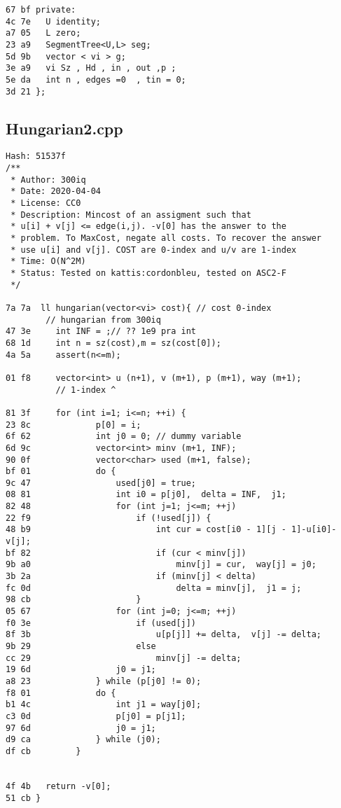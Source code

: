 \documentclass[11pt, a4paper, twoside]{article}
\begin{document}
\begin{lstlisting}
67 bf private:
4c 7e 	U identity;
a7 05 	L zero;
23 a9 	SegmentTree<U,L> seg;
5d 9b 	vector < vi > g; 
3e a9 	vi Sz , Hd , in , out ,p ; 
5e da 	int n , edges =0  , tin = 0;
3d 21 };	
\end{lstlisting}

\subsection{Hungarian2.cpp}
\begin{lstlisting}
Hash: 51537f
/**
 * Author: 300iq
 * Date: 2020-04-04
 * License: CC0
 * Description: Mincost of an assigment such that
 * u[i] + v[j] <= edge(i,j). -v[0] has the answer to the
 * problem. To MaxCost, negate all costs. To recover the answer
 * use u[i] and v[j]. COST are 0-index and u/v are 1-index 
 * Time: O(N^2M)
 * Status: Tested on kattis:cordonbleu, tested on ASC2-F
 */
 
7a 7a  ll hungarian(vector<vi> cost){ // cost 0-index
        // hungarian from 300iq
47 3e     int INF = ;// ?? 1e9 pra int 
68 1d     int n = sz(cost),m = sz(cost[0]);
4a 5a     assert(n<=m);
      
01 f8     vector<int> u (n+1), v (m+1), p (m+1), way (m+1);
          // 1-index ^
         
81 3f     for (int i=1; i<=n; ++i) {
23 8c             p[0] = i;
6f 62             int j0 = 0; // dummy variable
6d 9c             vector<int> minv (m+1, INF);
90 0f             vector<char> used (m+1, false);
bf 01             do {
9c 47                 used[j0] = true;
08 81                 int i0 = p[j0],  delta = INF,  j1;
82 48                 for (int j=1; j<=m; ++j)
22 f9                     if (!used[j]) {
48 b9                         int cur = cost[i0 - 1][j - 1]-u[i0]-v[j];
bf 82                         if (cur < minv[j])
9b a0                             minv[j] = cur,  way[j] = j0;
3b 2a                         if (minv[j] < delta)
fc 0d                             delta = minv[j],  j1 = j;
98 cb                     }
05 67                 for (int j=0; j<=m; ++j)
f0 3e                     if (used[j])
8f 3b                         u[p[j]] += delta,  v[j] -= delta;
9b 29                     else
cc 29                         minv[j] -= delta;
19 6d                 j0 = j1;
a8 23             } while (p[j0] != 0);
f8 01             do {
b1 4c                 int j1 = way[j0];
c3 0d                 p[j0] = p[j1];
97 6d                 j0 = j1;
d9 ca             } while (j0);
df cb         }
          
      
4f 4b   return -v[0];
51 cb }
\end{lstlisting}
\end{document}
